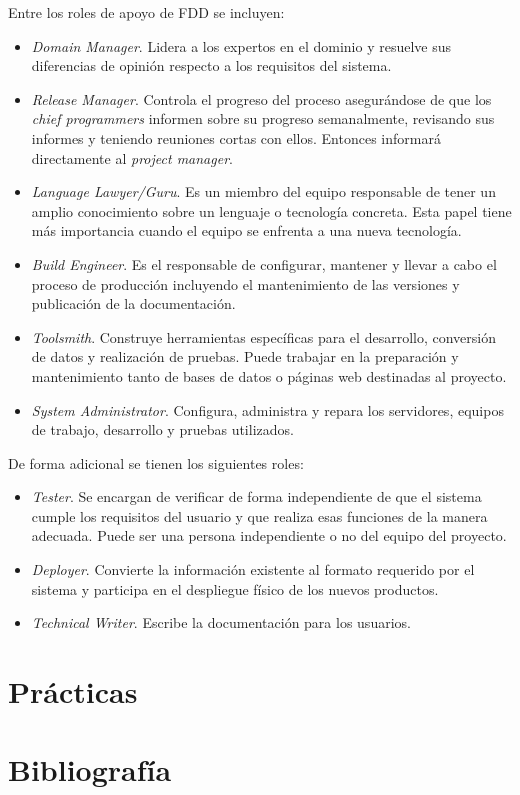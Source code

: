 \documentclass[11pt]{article}
\begin{document}
Entre los roles de apoyo de FDD se incluyen:

\begin{itemize}
\item \textit{Domain Manager}. Lidera a los expertos en el dominio y resuelve sus diferencias de opinión respecto a los requisitos del sistema.
\item \textit{Release Manager}. Controla el progreso del proceso asegurándose de que los \textit{chief programmers} informen sobre su progreso semanalmente, revisando sus informes y teniendo reuniones cortas con ellos. Entonces informará directamente al \textit{project manager}.
\item \textit{Language Lawyer/Guru}. Es un miembro del equipo responsable de tener un amplio conocimiento sobre un lenguaje o tecnología concreta. Esta papel tiene más importancia cuando el equipo se enfrenta a una nueva tecnología.
\item \textit{Build Engineer}. Es el responsable de configurar, mantener y llevar a cabo el proceso de producción incluyendo el mantenimiento de las versiones y publicación de la documentación.
\item \textit{Toolsmith}. Construye herramientas específicas para el desarrollo, conversión de datos y realización de pruebas. Puede trabajar en la preparación y mantenimiento tanto de bases de datos o páginas web destinadas al proyecto.
\item \textit{System Administrator}. Configura, administra y repara los servidores, equipos de trabajo, desarrollo y pruebas utilizados. 
\end{itemize}

De forma adicional se tienen los siguientes roles:

\begin{itemize}
\item \textit{Tester}. Se encargan de verificar de forma independiente de que el sistema cumple los requisitos del usuario y que realiza esas funciones de la manera adecuada. Puede ser una persona independiente o no del equipo del proyecto.
\item \textit{Deployer}. Convierte la información existente al formato requerido por el sistema y participa en el despliegue físico de los nuevos productos. 
\item \textit{Technical Writer}. Escribe la documentación para los usuarios.

\end{itemize}

\section{Prácticas}

\newpage
\section{Bibliografía}
\nocite{*}


\end{document}
